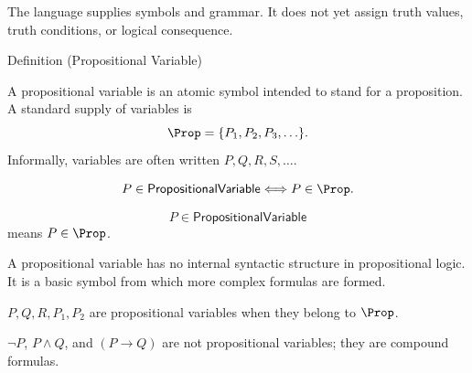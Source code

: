 \begin{remark*}[Interpretation]
The language supplies symbols and grammar. It does not yet assign truth values, truth conditions, or logical consequence.
\end{remark*}

\DefinitionalRoot
\begin{definitionbox}{Definition (Propositional Variable)}
\begin{definition}
\label{def:propositional-variable}
A propositional variable is an atomic symbol intended to stand for a proposition. A standard supply of variables is
\[
\Prop=\{P_1,P_2,P_3,\ldots\}.
\]
Informally, variables are often written \(P,Q,R,S,\ldots\).
\end{definition}
\end{definitionbox}

\begin{remark*}
\[
P\in\mathsf{PropositionalVariable}\Longleftrightarrow P\in\Prop.
\]
\end{remark*}

\begin{remark*}
\[
  P\in\mathsf{PropositionalVariable}
\] means \(P\in\Prop\).
\end{remark*}

\begin{remark*}[Interpretation]
A propositional variable has no internal syntactic structure in propositional logic. It is a basic symbol from which more complex formulas are formed.
\end{remark*}

\begin{remark*}[Examples]
\(P,Q,R,P_1,P_2\) are propositional variables when they belong to \(\Prop\).
\end{remark*}

\begin{remark*}
\(\neg P\), \(P\land Q\), and \((P\to Q)\) are not propositional variables; they are compound formulas.
\end{remark*}

